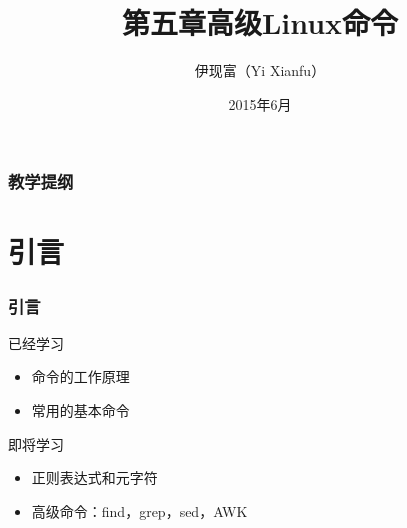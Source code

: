 



\title[高级Linux命令]{第五章\quad 高级Linux命令}
\author[Yixf]{伊现富（Yi Xianfu）}
\date{2015年6月}


\begin{frame}
  \titlepage
\end{frame}

\begin{frame}[plain,label=current]
  \frametitle{教学提纲}
  \setcounter{tocdepth}{3}
  \begin{multicols}{2}
    \tableofcontents
  \end{multicols}
\end{frame}


\section{引言}
\begin{frame}
  \frametitle{引言}
  \begin{block}{已经学习}
    \begin{itemize}
      \item 命令的工作原理
      \item 常用的基本命令
    \end{itemize}
  \end{block}
  \pause
  \begin{block}{即将学习}
    \begin{itemize}
      \item 正则表达式和元字符
      \item 高级命令：find，grep，sed，AWK
    \end{itemize}
  \end{block}
\end{frame}

